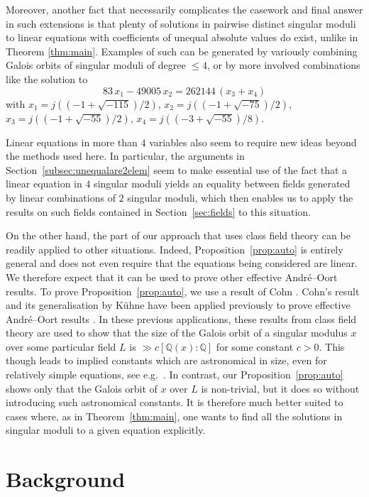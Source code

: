 \documentclass[12pt,a4paper,oneside]{amsart}
\begin{document}
Moreover, another fact that necessarily complicates the casework and final answer in such extensions is that plenty of solutions in pairwise distinct singular moduli to linear equations with coefficients of unequal absolute values do exist, unlike in Theorem \ref{thm:main}. 
Examples of such can be generated by variously combining Galois orbits of singular moduli of degree $\le 4$, or by more involved combinations like the solution to
\[ 83\, x_1-49005\, x_2 = 262144\,(x_3+x_4) \]
with $x_1=j\left((-1+\sqrt{-115})/2\right)$, $x_2=j\left( (-1+\sqrt{-75})/2\right)$, $x_3=j\left( (-1+\sqrt{-55})/2\right)$, $x_4=j\left( (-3+\sqrt{-55})/8\right)$.

   Linear equations in more than $4$ variables also seem to require new ideas beyond the methods used here.
   In particular, the arguments in Section~\ref{subsec:unequalare2elem} seem to make essential use of the fact that a linear equation in $4$ singular moduli yields an equality between fields generated by linear combinations of $2$ singular moduli, which then enables us to apply the results on such fields contained in Section~\ref{sec:fields} to this situation.

   On the other hand, the part of our approach that uses class field theory can be readily applied to other situations.
   Indeed, Proposition~\ref{prop:auto} is entirely general and does not even require that the equations being considered are linear.
We therefore expect that it can be used to prove other effective Andr\'e--Oort results.
To prove Proposition~\ref{prop:auto}, we use a result of Cohn \cite[Th.~8.3.12]{Cohn94}. 
Cohn's result and its generalisation by K\"uhne \cite[Cor.~1.2]{Kuhne21} have been applied previously to prove effective Andr\'e--Oort results \cite{BiluKuhne20, Binyamini19}.
In these previous applications, these results from class field theory are used to show that the size of the Galois orbit of a singular modulus $x$ over some particular field $L$ is $\gg c [\mathbb{Q}(x) : \mathbb{Q}]$ for some constant $c > 0$.
This though leads to implied constants which are astronomical in size, even for relatively simple equations, see e.g.~\cite[(40)]{BiluKuhne20}.
In contrast, our Proposition~\ref{prop:auto} shows only that the Galois orbit of $x$ over $L$ is non-trivial, but it does so without introducing such astronomical constants.
It is therefore much better suited to cases where, as in Theorem~\ref{thm:main}, one wants to find all the solutions in singular moduli to a given equation explicitly.
   
    \section{Background}\label{sec:background}
	
\end{document}

